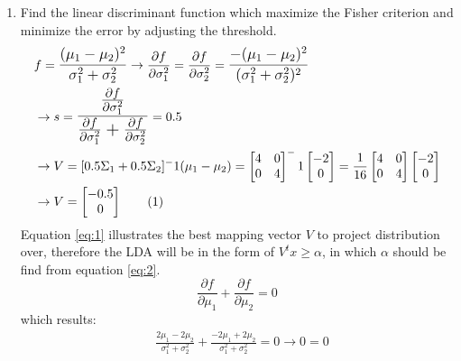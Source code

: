 \documentclass[12pt]{article}
\newcommand\numberthis{\addtocounter{equation}{1}\tag{\theequation}}
\begin{document}
\begin{enumerate}
\item Find the linear discriminant function which maximize the Fisher criterion and
minimize the error by adjusting the threshold.\\
\begin{align*}
&f = \mathlarger{\frac{(\mu_1 - \mu_2)^2}{\sigma_1^2 + \sigma_2^2}} \rightarrow \frac{\partial f}{\partial \sigma_1^2} =  \frac{\partial f}{\partial \sigma_2^2} = \mathlarger{\frac{-(\mu_1 - \mu_2)^2}{(\sigma_1^2 + \sigma_2^2)^2}} \\
&\rightarrow s = \mathlarger{\mathlarger{\frac{\frac{\partial f}{\partial \sigma_1^2}}{\frac{\partial f}{\partial \sigma_1^2} + \frac{\partial f}{\partial \sigma_2^2}}}} = 0.5\\
&\rightarrow V = [0.5 \Sigma_1 + 0.5 \Sigma_2]^-1 (\mu_1 - \mu_2) = \left[\begin{matrix}
4 & 0\\
0 & 4
\end{matrix}
\right]^-1 \left[ \begin{matrix}
-2 \\
0
\end{matrix} \right] = \frac{1}{16} \left[ \begin{matrix}
4 & 0 \\
0 & 4
\end{matrix} \right] \left[ \begin{matrix}
-2 \\
0
\end{matrix} \right] \\ 
&\rightarrow V = \left[ \begin{matrix}
-0.5\\0
\end{matrix}\right] \numberthis \label{eq:1}
\end{align*}
Equation \eqref{eq:1} illustrates the best mapping vector $V$ to project distribution over, therefore the LDA will be in the form of $V^t x \geq \alpha$, in which $\alpha$ should be find from equation \eqref{eq:2}.
\begin{equation}
\frac{\partial f}{\partial \mu_1} + \frac{\partial f}{\partial \mu_2} = 0
\label{eq:2}
\end{equation}
which results:
\begin{align*}
&\frac{2\mu_1 - 2\mu_2}{\sigma_1^2 + \sigma_2^2} + \frac{- 2\mu_1 + 2\mu_2}{\sigma_1^2 + \sigma_2^2} = 0 \rightarrow 0 = 0
\end{align*}

\end{enumerate}
\end{document}
